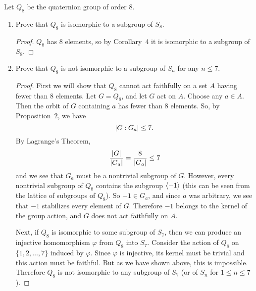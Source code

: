 Let $Q_8$ be the quaternion group of order $8$.
\begin{enumerate}
\item Prove that $Q_8$ is isomorphic to a subgroup of $S_8$.
  \begin{proof}
    $Q_8$ has $8$ elements, so by Corollary~4 it is isomorphic to a
    subgroup of $S_8$.
  \end{proof}

\item Prove that $Q_8$ is not isomorphic to a subgroup of $S_n$ for
  any $n\leq7$.
  \begin{proof}
    First we will show that $Q_8$ cannot act faithfully on a set $A$
    having fewer than $8$ elements. Let $G = Q_8$, and let $G$ act on
    $A$. Choose any $a\in A$. Then the orbit of $G$ containing $a$ has
    fewer than $8$ elements. So, by Proposition~2, we have
    \begin{equation*}
      \lvert{G : G_a}\rvert \leq 7.
    \end{equation*}
    By Lagrange's Theorem,
    \begin{equation*}
      \frac{\lvert{G}\rvert}{\lvert{G_a}\rvert} = \frac8{\lvert{G_a}\rvert} \leq 7
    \end{equation*}
    and we see that $G_a$ must be a nontrivial subgroup of
    $G$. However, every nontrivial subgroup of $Q_8$ contains the
    subgroup $\langle{-1}\rangle$ (this can be seen from the lattice of
    subgroups of $Q_8$). So $-1\in G_a$, and since $a$ was arbitrary,
    we see that $-1$ stabilizes every element of $G$. Therefore $-1$
    belongs to the kernel of the group action, and $G$ does not act
    faithfully on $A$.

    Next, if $Q_8$ is isomorphic to some subgroup of $S_7$, then we
    can produce an injective homomorphism $\varphi$ from $Q_8$ into
    $S_7$. Consider the action of $Q_8$ on $\{1,2,\dots,7\}$ induced
    by $\varphi$. Since $\varphi$ is injective, its kernel must be
    trivial and this action must be faithful. But as we have shown
    above, this is impossible. Therefore $Q_8$ is not isomorphic to
    any subgroup of $S_7$ (or of $S_n$ for $1\leq n\leq7$).
  \end{proof}
\end{enumerate}
